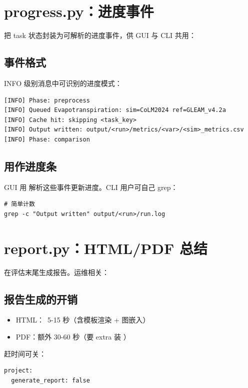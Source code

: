 \section{progress.py：进度事件}

 把 task 状态封装为可解析的进度事件，供 GUI 与 CLI 共用：

\subsection{事件格式}

INFO 级别消息中可识别的进度模式：

\begin{verbatim}
[INFO] Phase: preprocess
[INFO] Queued Evapotranspiration: sim=CoLM2024 ref=GLEAM_v4.2a
[INFO] Cache hit: skipping <task_key>
[INFO] Output written: output/<run>/metrics/<var>/<sim>_metrics.csv
[INFO] Phase: comparison
\end{verbatim}

\subsection{用作进度条}

GUI 用  解析这些事件更新进度。CLI 用户可自己 grep：

\begin{verbatim}
# 简单计数
grep -c "Output written" output/<run>/run.log
\end{verbatim}

\section{report.py：HTML/PDF 总结}

 在评估末尾生成报告。运维相关：

\subsection{报告生成的开销}

\begin{itemize}
  \item HTML：~5-15 秒（含模板渲染 + 图嵌入）
  \item PDF：额外 30-60 秒（要 \cli{[report]} extra 装 ）
\end{itemize}

赶时间可关：

\begin{verbatim}
project:
  generate_report: false
\end{verbatim}

